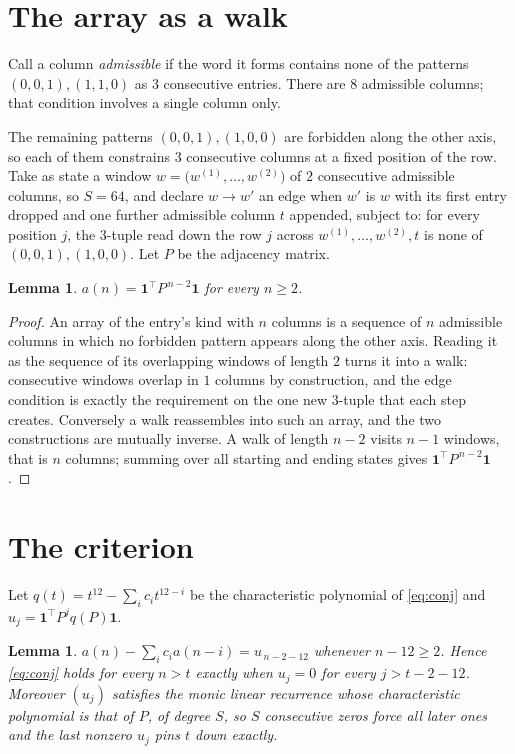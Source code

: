 \documentclass[11pt,a4paper]{article}
\theoremstyle{plain}
\newtheorem{lemma}[theorem]{Lemma}
\theoremstyle{definition}
\begin{document}
\section{The array as a walk}

Call a column \emph{admissible} if the word it forms contains none of the patterns
$(0,0,1), (1,1,0)$ as $3$ consecutive entries. There are $8$ admissible columns; that condition
involves a single column only.

The remaining patterns $(0,0,1), (1,0,0)$ are forbidden along the other axis, so each of them
constrains $3$ consecutive columns at a fixed position of the row. Take as state a
window $w=\bigl(w^{(1)},\dots,w^{(2)}\bigr)$ of $2$ consecutive admissible
columns, so $S=64$, and declare $w\to w'$ an edge when $w'$ is $w$ with its first entry
dropped and one further admissible column $t$ appended, subject to: for every position
$j$, the $3$-tuple read down the row $j$ across $w^{(1)},\dots,w^{(2)},t$
is none of $(0,0,1), (1,0,0)$. Let $P$ be the adjacency matrix.

\begin{lemma}\label{lem:walk}
$a(n)=\mathbf{1}^{\!\top}P^{\,n-2}\mathbf{1}$ for every $n\ge2$.
\end{lemma}

\begin{proof}
An array of the entry's kind with $n$ columns is a sequence of $n$ admissible columns in
which no forbidden pattern appears along the other axis. Reading it as the sequence of its
overlapping windows of length $2$ turns it into a walk: consecutive windows overlap in
$1$ columns by construction, and the edge condition is exactly the requirement on the one
new $3$-tuple that each step creates. Conversely a walk reassembles into such an array,
and the two constructions are mutually inverse. A walk of length $n-2$ visits $n-1$
windows, that is $n$ columns; summing over all starting and ending states gives
$\mathbf{1}^{\!\top}P^{\,n-2}\mathbf{1}$.
\end{proof}

\section{The criterion}

Let $q(t)=t^{12}-\sum_i c_i t^{12-i}$ be the characteristic polynomial of
\eqref{eq:conj} and $u_j=\mathbf{1}^{\!\top}P^{j}q(P)\mathbf{1}$.

\begin{lemma}\label{lem:crit}
$a(n)-\sum_i c_i a(n-i)=u_{\,n-2-12}$ whenever $n-12\ge2$. Hence
\eqref{eq:conj} holds for every $n>t$ exactly when $u_j=0$ for every
$j>t-2-12$. Moreover $(u_j)$ satisfies the monic linear recurrence whose
characteristic polynomial is that of $P$, of degree $S$, so $S$ consecutive zeros force all
later ones and the last nonzero $u_j$ pins $t$ down exactly.
\end{lemma}
\end{document}
